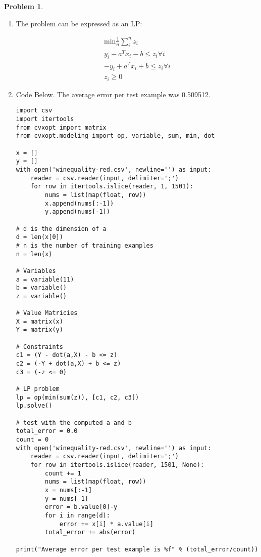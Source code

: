 \documentclass[11pt]{article}
\theoremstyle{definition}
\theoremstyle{case}
\theoremstyle{theorem}
\newtheorem{prob}{Problem}
\begin{document}
\vspace{20px}

\begin{prob}
\end{prob}

\begin{enumerate}[label=(\alph*)]

\item The problem can be expressed as an LP:

\begin{align*}
  \text{min} \frac{1}{n} \sum_{i}^{n} z_i \\
  y_i -a^Tx_i - b \leq z_i \forall i \\
  -y_i + a^Tx_i + b \leq z_i \forall i \\
  z_i \geq 0
\end{align*}

\item Code Below. The average error per test example was 0.509512.
\begin{verbatim}
import csv
import itertools
from cvxopt import matrix
from cvxopt.modeling import op, variable, sum, min, dot

x = []
y = []
with open('winequality-red.csv', newline='') as input:    
    reader = csv.reader(input, delimiter=';')
    for row in itertools.islice(reader, 1, 1501):
        nums = list(map(float, row))
        x.append(nums[:-1])
        y.append(nums[-1])

# d is the dimension of a
d = len(x[0])
# n is the number of training examples
n = len(x)

# Variables
a = variable(11)
b = variable()
z = variable()

# Value Matricies
X = matrix(x)
Y = matrix(y)

# Constraints
c1 = (Y - dot(a,X) - b <= z)
c2 = (-Y + dot(a,X) + b <= z)
c3 = (-z <= 0)

# LP problem
lp = op(min(sum(z)), [c1, c2, c3])
lp.solve()

# test with the computed a and b
total_error = 0.0
count = 0
with open('winequality-red.csv', newline='') as input:
    reader = csv.reader(input, delimiter=';')
    for row in itertools.islice(reader, 1501, None):
        count += 1
        nums = list(map(float, row))
        x = nums[:-1]
        y = nums[-1]
        error = b.value[0]-y
        for i in range(d):
            error += x[i] * a.value[i]
        total_error += abs(error)

print("Average error per test example is %f" % (total_error/count))

\end{verbatim}

\end{enumerate}
\end{document}
